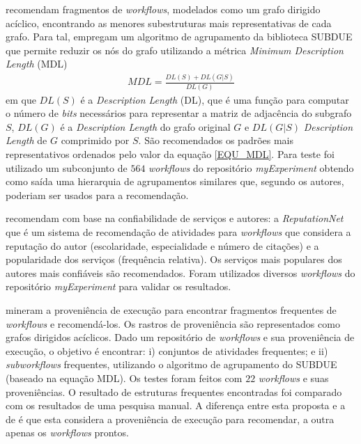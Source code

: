  recomendam fragmentos de \emph{workflows}, modelados como um grafo dirigido acíclico, encontrando as menores subestruturas mais representativas de cada grafo. Para tal, empregam um algoritmo de agrupamento da biblioteca SUBDUE que permite reduzir os nós do grafo utilizando a métrica \emph{Minimum Description Length} (MDL)
\begin{align}
MDL = \frac{DL(S)+DL(G|S)}{DL(G)} \label{EQU_MDL}
\end{align}
em que \(DL(S)\) é a \emph{Description Length} (DL), que é uma função para computar o número de \emph{bits} necessários para representar a matriz de adjacência do subgrafo \(S\), \(DL(G)\) é a \emph{Description Length} do grafo original \(G\) e \(DL(G|S)\) \emph{Description Length} de \(G\) comprimido por \(S\). São recomendados os padrões mais representativos ordenados pelo valor da equação \eqref{EQU_MDL}. Para teste foi utilizado um subconjunto de \(564\) \emph{workflows} do repositório \emph{myExperiment} \cite{ROURE2015} obtendo como saída uma hierarquia de agrupamentos similares que, segundo os autores, poderiam ser usados para a recomendação.

 recomendam com base na confiabilidade de serviços e autores: a \emph{ReputationNet} que é um sistema de recomendação de atividades para \emph{workflows} que considera a reputação do autor (escolaridade, especialidade e número de citações) e a popularidade dos serviços (frequência relativa). Os serviços mais populares dos autores mais confiáveis são recomendados. Foram utilizados diversos \emph{workflows} do repositório \emph{myExperiment} \cite{ROURE2015} para validar os resultados.

 mineram a proveniência de execução para encontrar fragmentos frequentes de \emph{workflows} e recomendá-los. Os rastros de proveniência são representados como grafos dirigidos acíclicos. Dado um repositório de \emph{workflows} e sua proveniência de execução, o objetivo é encontrar: i) conjuntos de atividades frequentes; e ii) \emph{subworkflows} frequentes, utilizando o algoritmo de agrupamento do SUBDUE (baseado na equação MDL). Os testes foram feitos com \(22\) \emph{workflows} e suas proveniências. O resultado de estruturas frequentes encontradas foi comparado com os resultados de uma pesquisa manual. A diferença entre esta proposta e a de  é que esta considera a proveniência de execução para recomendar, a outra apenas os \emph{workflows} prontos.

